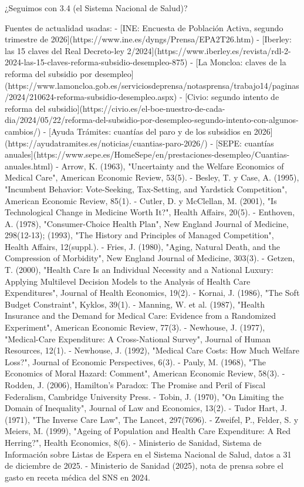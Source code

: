 \documentclass[10pt,a4paper]{article}
\begin{document}
¿Seguimos con 3.4 (el Sistema Nacional de Salud)?

Fuentes de actualidad usadas:
- [INE: Encuesta de Población Activa, segundo trimestre de 2026](https://www.ine.es/dyngs/Prensa/EPA2T26.htm)
- [Iberley: las 15 claves del Real Decreto-ley 2/2024](https://www.iberley.es/revista/rdl-2-2024-las-15-claves-reforma-subsidio-desempleo-875)
- [La Moncloa: claves de la reforma del subsidio por desempleo](https://www.lamoncloa.gob.es/serviciosdeprensa/notasprensa/trabajo14/paginas/2024/210624-reforma-subsidio-desempleo.aspx)
- [Civio: segundo intento de reforma del subsidio](https://civio.es/el-boe-nuestro-de-cada-dia/2024/05/22/reforma-del-subsidio-por-desempleo-segundo-intento-con-algunos-cambios/)
- [Ayuda Trámites: cuantías del paro y de los subsidios en 2026](https://ayudatramites.es/noticias/cuantias-paro-2026/)
- [SEPE: cuantías anuales](https://www.sepe.es/HomeSepe/en/prestaciones-desempleo/Cuantias-anuales.html)
- Arrow, K. (1963), "Uncertainty and the Welfare Economics of Medical Care", American Economic Review, 53(5).
- Besley, T. y Case, A. (1995), "Incumbent Behavior: Vote-Seeking, Tax-Setting, and Yardstick Competition", American Economic Review, 85(1).
- Cutler, D. y McClellan, M. (2001), "Is Technological Change in Medicine Worth It?", Health Affairs, 20(5).
- Enthoven, A. (1978), "Consumer-Choice Health Plan", New England Journal of Medicine, 298(12-13); (1993), "The History and Principles of Managed Competition", Health Affairs, 12(suppl.).
- Fries, J. (1980), "Aging, Natural Death, and the Compression of Morbidity", New England Journal of Medicine, 303(3).
- Getzen, T. (2000), "Health Care Is an Individual Necessity and a National Luxury: Applying Multilevel Decision Models to the Analysis of Health Care Expenditures", Journal of Health Economics, 19(2).
- Kornai, J. (1986), "The Soft Budget Constraint", Kyklos, 39(1).
- Manning, W. et al. (1987), "Health Insurance and the Demand for Medical Care: Evidence from a Randomized Experiment", American Economic Review, 77(3).
- Newhouse, J. (1977), "Medical-Care Expenditure: A Cross-National Survey", Journal of Human Resources, 12(1).
- Newhouse, J. (1992), "Medical Care Costs: How Much Welfare Loss?", Journal of Economic Perspectives, 6(3).
- Pauly, M. (1968), "The Economics of Moral Hazard: Comment", American Economic Review, 58(3).
- Rodden, J. (2006), Hamilton's Paradox: The Promise and Peril of Fiscal Federalism, Cambridge University Press.
- Tobin, J. (1970), "On Limiting the Domain of Inequality", Journal of Law and Economics, 13(2).
- Tudor Hart, J. (1971), "The Inverse Care Law", The Lancet, 297(7696).
- Zweifel, P., Felder, S. y Meiers, M. (1999), "Ageing of Population and Health Care Expenditure: A Red Herring?", Health Economics, 8(6).
- Ministerio de Sanidad, Sistema de Información sobre Listas de Espera en el Sistema Nacional de Salud, datos a 31 de diciembre de 2025.
- Ministerio de Sanidad (2025), nota de prensa sobre el gasto en receta médica del SNS en 2024.
\end{document}

